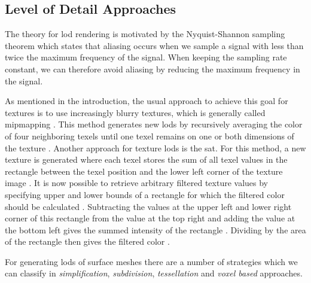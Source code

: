 \subsection{Level of Detail Approaches}
The theory for \ac{lod} rendering is motivated by the Nyquist-Shannon sampling theorem \cite{shannonsampling} which states that aliasing occurs when we sample a signal with less than twice the maximum frequency of the signal.
When keeping the sampling rate constant, we can therefore avoid aliasing by reducing the maximum frequency in the signal.

As mentioned in the introduction, the usual approach to achieve this goal for textures is to use increasingly blurry textures, which is generally called mipmapping \cite{mipmapping}.
This method generates new \acsp{lod} by recursively averaging the color of four neighboring texels until one texel remains on one or both dimensions of the texture \cite{mipmapping}.
Another approach for texture \acsp{lod} is the \ac{sat}.
For this method, a new texture is generated where each texel stores the sum of all texel values in the rectangle between the texel position and the lower left corner of the texture image \cite{crow_summed_area_tables}.
It is now possible to retrieve arbitrary filtered texture values by specifying upper and lower bounds of a rectangle for which the filtered color should be calculated \cite{crow_summed_area_tables}.
Subtracting the values at the upper left and lower right corner of this rectangle from the value at the top right and adding the value at the bottom left gives the summed intensity of the rectangle \cite{crow_summed_area_tables}.
Dividing by the area of the rectangle then gives the filtered color \cite{crow_summed_area_tables}.

For generating \acsp{lod} of surface meshes there are a number of strategies which we can classify in \textit{simplification}, \textit{subdivision}, \textit{tessellation} and \textit{voxel based} approaches.

